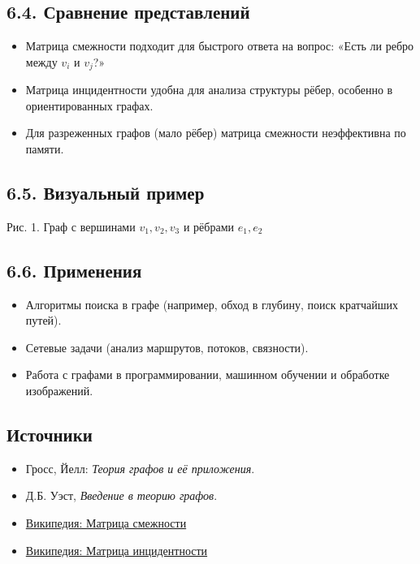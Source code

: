 \documentclass{article}
\begin{document}
\subsection*{6.4. Сравнение представлений}

\begin{itemize}[leftmargin=*]
  \item Матрица смежности подходит для быстрого ответа на вопрос: «Есть ли ребро между $v_i$ и $v_j$?»
  \item Матрица инцидентности удобна для анализа структуры рёбер, особенно в ориентированных графах.
  \item Для разреженных графов (мало рёбер) матрица смежности неэффективна по памяти.
\end{itemize}

\subsection*{6.5. Визуальный пример}

\begin{center}

\vspace{0.5em}
\small Рис. 1. Граф с вершинами $v_1, v_2, v_3$ и рёбрами $e_1, e_2$
\end{center}

\subsection*{6.6. Применения}

\begin{itemize}[leftmargin=*]
  \item Алгоритмы поиска в графе (например, обход в глубину, поиск кратчайших путей).
  \item Сетевые задачи (анализ маршрутов, потоков, связности).
  \item Работа с графами в программировании, машинном обучении и обработке изображений.
\end{itemize}

\subsection*{Источники}

\begin{itemize}
  \item Гросс, Йелл: \emph{Теория графов и её приложения}.
  \item Д.Б. Уэст, \emph{Введение в теорию графов}.
  \item \href{https://ru.wikipedia.org/wiki/Матрица_смежности}{Википедия: Матрица смежности}
  \item \href{https://ru.wikipedia.org/wiki/Матрица_инцидентности}{Википедия: Матрица инцидентности}
\end{itemize}
\end{document}
